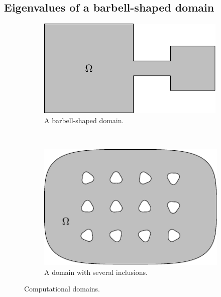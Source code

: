 \subsection{Eigenvalues of a barbell-shaped domain}
\label{subsec:barbell}

\begin{figure}
  \centering
  \begin{subfigure}[t]{0.4\textwidth}
    \centering
    \includegraphics[width=\textwidth]{ex_barbell_001_bdry}
    \caption{A barbell-shaped domain.}
    \label{subfig:barbell_bdry}
  \end{subfigure}
  ~
  \begin{subfigure}[t]{0.4\textwidth}
    \centering
    \includegraphics[width=\textwidth]{ex_many_holes_004_bdry}
    \caption{A domain with several inclusions.}
    \label{subfig:many_inclusions_bdry}
  \end{subfigure}
  \caption{Computational domains.}
\end{figure}

